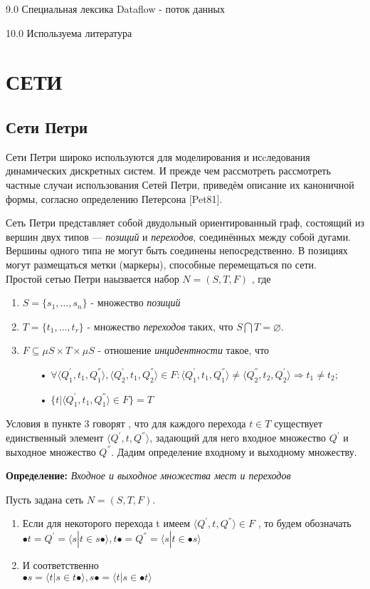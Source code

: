 \documentclass[a4paper,14pt]{article}
\begin{document}
9.0  Специальная лексика
 Dataflow - поток данных 


10.0 Используема литература

\section{СЕТИ}
\subsection{Сети Петри}
Сети Петри широко используются для моделирования и исcледования динамических дискретных систем. 
И прежде чем рассмотреть рассмотреть частные случаи использования Сетей Петри, приведём описание их каноничной формы, согласно определению Петерсона [Pet81].
\par Сеть Петри представляет собой двудольный ориентированный граф, состоящий из вершин двух типов — \textit{позиций} и \textit{переходов}, соединённых между собой дугами. Вершины одного типа не могут быть соединены непосредственно. В позициях могут размещаться метки (маркеры), способные перемещаться по сети.\\
Простой сетью Петри наызвается набор $N = (S,T,F)$ , где
\begin{enumerate}
\item $S = \lbrace s_{1},\ldots,s_{n} \rbrace$ - множество \textit{позиций}
\item $T = \lbrace t_{1},\ldots,t_{r} \rbrace$ - множество \textit{переходов} таких, что $S \bigcap T = \varnothing$.
\item $F \subseteq \mu S \times T \times \mu S$ - отношение \textit{инцидентности} такое, что 
\begin{enumerate}
\item[•] $\forall \langle  Q_{1}^{'}, t_{1}, Q_{1}^{''} \rangle , \langle Q_{2}^{'}, t_{1}, Q_{2}^{''}\rangle \in F : \langle Q_{1}^{'}, t_{1}, Q_{1}^{''} \rangle \neq \langle Q_{2}^{''}, t_{2}, Q_{2}^{'}\rangle \Rightarrow t_{1} \neq t_{2};$
\item[•] $\lbrace t | \langle  Q_{1}^{'}, t_{1}, Q_{1}^{''} \rangle \in F \rbrace = T$
\end{enumerate}
\end{enumerate} 
Условия в пункте 3 говорят , что для каждого перехода $t \in T$ существует единственный элемент $\langle Q^{'}, t, Q^{''} \rangle$, задающий для него входное множество $Q^{'}$ и  выходное множество $Q^{''}$. Дадим определение входному и выходному множеству.

\textbf{Определение:}  \textit{Входное и выходное множества мест и переходов}
\par Пусть задана сеть $N = (S,T,F)$.
\begin{enumerate}
\item Если для некоторого перехода t имеем $\langle Q^{'}, t, Q^{''} \rangle \in F$ , то будем обозначать \\$\bullet t = Q^{'} = \langle s |t \in s \bullet \rangle , t  \bullet = Q^{''} = \langle s | t \in \bullet s \rangle$
\item  И соответственно\\$\bullet s = \langle t|s \in t \bullet \rangle , s \bullet = \langle t | s \in \bullet t \rangle$
\end{enumerate}
\end{document}
